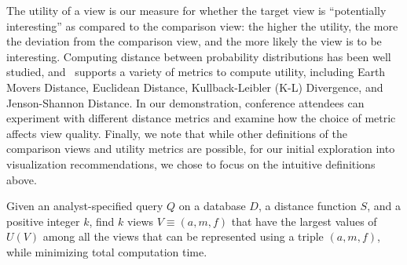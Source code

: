 The utility of a view is our measure for whether the target view is
``potentially interesting'' as compared to the comparison view:
the higher the utility, the more the deviation
from the comparison view, and the more likely the view is to be interesting.
Computing distance between probability distributions has
been well studied, and \SeeDB\ supports a variety of metrics
to compute utility, including Earth Movers Distance, 
Euclidean Distance, Kullback-Leibler (K-L) Divergence, and Jenson-Shannon
Distance. 
In our demonstration, conference attendees can experiment with
different distance metrics and examine how the choice of metric affects view
quality.
Finally, we note that while other definitions of the comparison views and
utility metrics are possible, for our initial exploration into 
visualization recommendations, we chose to focus on the intuitive definitions above.
\begin{problem}
\vspace{-5pt}
Given an analyst-specified query $Q$ on a database $D$, a distance function $S$,
and a positive integer $k$, find $k$ views $V \equiv (a, m, f)$ that
have the largest values of $U(V)$ among all the views that can be represented
using a triple $(a, m, f)$, while minimizing total computation time.
\vspace{-5pt}
\end{problem}

